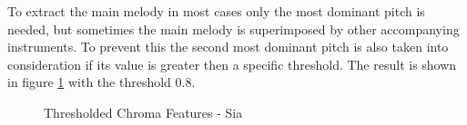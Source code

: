 To extract the main melody in most cases only the most dominant pitch is needed, but sometimes the main melody is superimposed by other accompanying instruments. To prevent this the second most dominant pitch is also taken into consideration if its value is greater then a specific threshold. 
The result is shown in figure \ref{fig:chromavg} with the threshold 0.8. 
\begin{figure}[htbp]
	\centering
	\caption{Thresholded Chroma Features - Sia}
	\label{fig:chromavg}
\end{figure}

